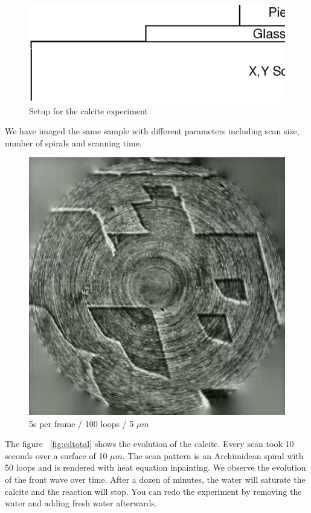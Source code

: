 \begin{figure}[H]
  \centering
  \includegraphics[scale=0.4]{images/calcitesetup.eps}
    \caption{Setup for the calcite experiment}
  \label{fig:calcitesetup}
\end{figure}

We have imaged the same sample with different parameters including scan size, number of spirals and scanning time.
\begin{figure}[H]
  \centering
  \includegraphics[scale=0.4]{images/calciteangle.png}
    \caption{5s per frame / 100 loops / 5 $\mu m$}
  \label{fig:calciteangle}
\end{figure}

The figure ~\ref{fig:cdtotal} shows the evolution of the calcite. Every scan took 10 seconds over a surface of 10 $\mu m$. The scan pattern is an Archimidean spiral with 50 loops and is rendered with heat equation inpainting. We observe the evolution of the front wave over time. After a dozen of minutes, the water will saturate the calcite and the reaction will stop. You can redo the experiment by removing the water and adding fresh water afterwards.


